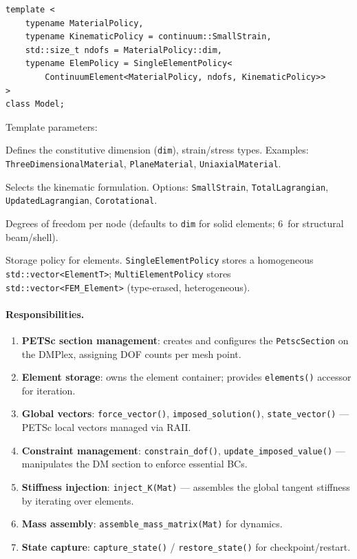 \begin{verbatim}
template <
    typename MaterialPolicy,
    typename KinematicPolicy = continuum::SmallStrain,
    std::size_t ndofs = MaterialPolicy::dim,
    typename ElemPolicy = SingleElementPolicy<
        ContinuumElement<MaterialPolicy, ndofs, KinematicPolicy>>
>
class Model;
\end{verbatim}

\noindent
Template parameters:

\begin{description}[style=nextline, leftmargin=2cm]
  \item[\texttt{MaterialPolicy}]
    Defines the constitutive dimension (\texttt{dim}), strain/stress types.
    Examples: \texttt{ThreeDimensionalMaterial}, \texttt{PlaneMaterial},
    \texttt{UniaxialMaterial}.

  \item[\texttt{KinematicPolicy}]
    Selects the kinematic formulation.
    Options: \texttt{SmallStrain}, \texttt{TotalLagrangian},
    \texttt{UpdatedLagrangian}, \texttt{Corotational}.

  \item[\texttt{ndofs}]
    Degrees of freedom per node (defaults to \texttt{dim} for solid
    elements; 6~for structural beam/shell).

  \item[\texttt{ElemPolicy}]
    Storage policy for elements.  \texttt{SingleElementPolicy} stores a
    homogeneous \texttt{std::vector<ElementT>};
    \texttt{MultiElementPolicy} stores \texttt{std::vector<FEM\_Element>}
    (type-erased, heterogeneous).
\end{description}

\paragraph{Responsibilities.}
\begin{enumerate}[nosep]
  \item \textbf{PETSc section management}: creates and configures the
        \texttt{PetscSection} on the DMPlex, assigning DOF counts per
        mesh point.
  \item \textbf{Element storage}: owns the element container; provides
        \texttt{elements()} accessor for iteration.
  \item \textbf{Global vectors}: \texttt{force\_vector()},
        \texttt{imposed\_solution()}, \texttt{state\_vector()} ---
        PETSc local vectors managed via RAII.
  \item \textbf{Constraint management}: \texttt{constrain\_dof()},
        \texttt{update\_imposed\_value()} --- manipulates the DM section
        to enforce essential BCs.
  \item \textbf{Stiffness injection}: \texttt{inject\_K(Mat)} --- assembles
        the global tangent stiffness by iterating over elements.
  \item \textbf{Mass assembly}: \texttt{assemble\_mass\_matrix(Mat)} for
        dynamics.
  \item \textbf{State capture}: \texttt{capture\_state()} /
        \texttt{restore\_state()} for checkpoint/restart.
\end{enumerate}


